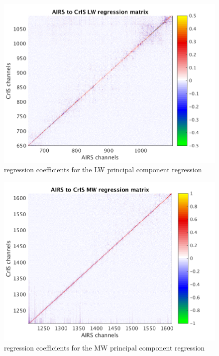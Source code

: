 \documentclass[10pt,twocolumn]{article}  %
\begin{document}
\begin{figure} %
  \centering
  \includegraphics[width=\linewidth]{slackfigs/LW_pc_regr_mat.png}
  \caption{regression coefficients for the LW principal component
    regression}
  \label{dreg7}
\end{figure}

\begin{figure} %
  \centering
  \includegraphics[width=\linewidth]{slackfigs/MW_pc_regr_mat.png}
  \caption{regression coefficients for the MW principal component
    regression}
  \label{dreg8}
\end{figure}
\end{document}
